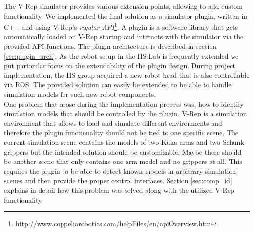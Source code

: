 The V-Rep simulator provides various extension points, allowing to add custom functionality. We implemented the final solution as a simulator plugin, written in C++ and using V-Rep's \emph{regular API}\footnote{http://www.coppeliarobotics.com/helpFiles/en/apiOverview.htm}. A plugin is a software library that gets automatically loaded on V-Rep startup and interacts with the simulator via the provided API functions. The plugin architecture is described in section \ref{sec:plugin_arch}. As the robot setup in the IIS-Lab is frequently extended we put particular focus on the extendability of the plugin design. During project implementation, the IIS group acquired a new robot head that is also controllable via ROS. The provided solution can easily be extended to be able to handle simulation models for such new robot components. \\

One problem that arose during the implementation process was, how to identify simulation models that should be controlled by the plugin. V-Rep is a simulation environment that allows to load and simulate different environments and therefore the plugin functionality should not be tied to one specific scene. The current simulation scene contains the models of two Kuka arms and two Schunk grippers but the intended solution should be customizable. Maybe there should be another scene that only contains one arm model and no grippers at all. This requires the plugin to be able to detect known models in arbitrary simulation scenes and then provide the proper control interfaces. Section \ref{sec:comp_id} explains in detail how this problem was solved along with the utilized V-Rep functionality. \\


